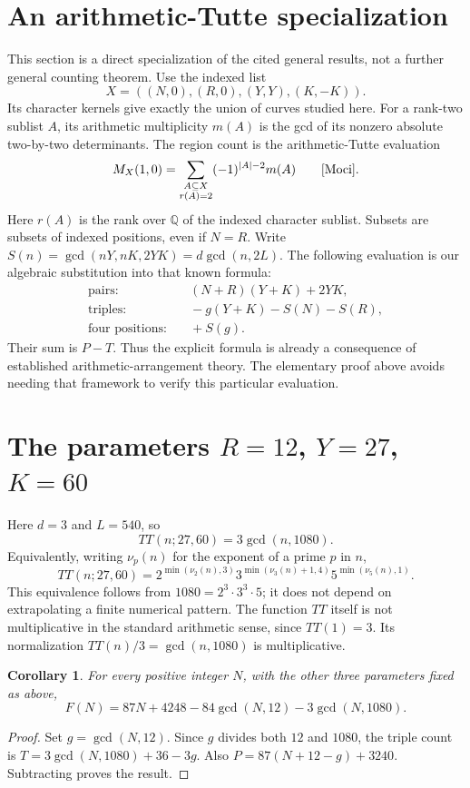 \documentclass[a4paper,11pt]{article}
\newtheorem{corollary}{Corollary}
\begin{document}
\section{An arithmetic-Tutte specialization}
This section is a direct specialization of the cited general results,
not a further general counting theorem. Use the indexed list
\[
 X=((N,0),(R,0),(Y,Y),(K,-K)).
\]
Its character kernels give exactly the union of curves studied here.
For a rank-two sublist $A$, its arithmetic multiplicity $m(A)$ is the
gcd of its nonzero absolute two-by-two determinants. The region count
is the arithmetic-Tutte evaluation
\[
 M_X(1,0)=\sum_{\substack{A\subseteq X\\r(A)=2}}
             (-1)^{|A|-2}m(A)\qquad\text{\cite{Moci}}.
\]
Here $r(A)$ is the rank over $\mathbb Q$ of the indexed character sublist.
Subsets are subsets of indexed positions, even if $N=R$.
Write $S(n)=\gcd(nY,nK,2YK)=d\gcd(n,2L)$. The following evaluation is
our algebraic substitution into that known formula:
\begin{align*}
 \text{pairs:}&\quad (N+R)(Y+K)+2YK,\\
 \text{triples:}&\quad -g(Y+K)-S(N)-S(R),\\
 \text{four positions:}&\quad +S(g).
\end{align*}
Their sum is $P-T$. Thus the explicit formula is already a consequence
of established arithmetic-arrangement theory. The elementary proof above
avoids needing that framework to verify this particular evaluation.

\section{The parameters \texorpdfstring{$R=12$, $Y=27$, $K=60$}{R=12, Y=27, K=60}}
Here $d=3$ and $L=540$, so
\[
 TT(n;27,60)=3\gcd(n,1080).
\]
Equivalently, writing $\nu_p(n)$ for the exponent of a prime $p$ in $n$,
\[
 TT(n;27,60)=2^{\min(\nu_2(n),3)}
             3^{\min(\nu_3(n)+1,4)}
             5^{\min(\nu_5(n),1)}.
\]
This equivalence follows from $1080=2^3\cdot3^3\cdot5$; it does not
depend on extrapolating a finite numerical pattern. The function $TT$
itself is not multiplicative in the standard arithmetic sense, since
$TT(1)=3$. Its normalization $TT(n)/3=\gcd(n,1080)$ is multiplicative.

\begin{corollary}
For every positive integer $N$, with the other three parameters fixed
as above,
\[
 \boxed{F(N)=87N+4248-84\gcd(N,12)-3\gcd(N,1080).}
\]
\end{corollary}
\begin{proof}
Set $g=\gcd(N,12)$. Since $g$ divides both $12$ and $1080$, the triple
count is $T=3\gcd(N,1080)+36-3g$. Also
$P=87(N+12-g)+3240$. Subtracting proves the result.
\end{proof}
\end{document}
